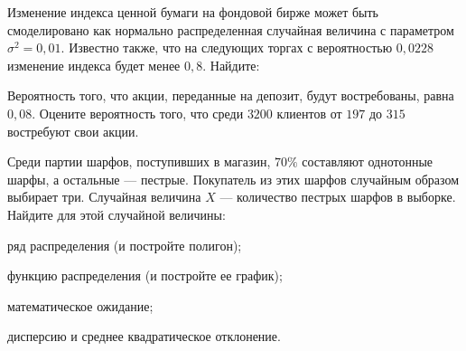 \vfil

\begin{zkrPlain}{25}\noindent 
	Изменение индекса ценной бумаги на фондовой бирже может быть смоделировано как нормально распределенная случайная величина с параметром $\sigma^2 = 0{,}01$. Известно также, что на следующих торгах с вероятностью $0{,}0228$ изменение индекса будет менее $0{,}8$. Найдите: \par {}
 
\end{zkrPlain}

\vfil

\begin{zkrPlain}{25}\noindent 
	Вероятность того, что акции, переданные на депозит, будут востребованы, равна $ 0{,}08 $. Оцените вероятность того, что среди $ 3200 $ клиентов от $ 197 $ до $ 315 $ востребуют свои акции.
 
\end{zkrPlain}

\newpage\setcounter{zad}{0}\setcounter{footnote}{0}



\begin{zkrPlain}{25}\noindent 
	Среди партии шарфов, поступивших в магазин, $70 \%$ составляют однотонные шарфы, а остальные --- пестрые. Покупатель из этих шарфов случайным образом выбирает три. Случайная величина $X$ --- количество пестрых шарфов в выборке.  Найдите для этой случайной величины: \par \smallskip\small{ \par \zz ряд распределения (и постройте полигон); \par \zz функцию распределения (и постройте ее график); \par \zz математическое ожидание; \par \zz дисперсию и среднее квадратическое отклонение.\par \par}
 
\end{zkrPlain}

\vfil

